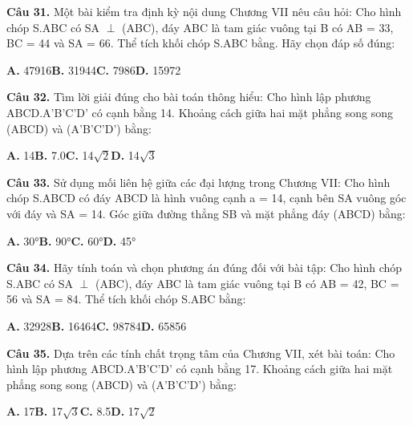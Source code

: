 \documentclass[11pt,a4paper]{article}
\begin{document}
\textbf{\color{primary} Câu 31.} Một bài kiểm tra định kỳ nội dung Chương VII nêu câu hỏi: Cho hình chóp S.ABC có SA $\perp$ (ABC), đáy ABC là tam giác vuông tại B có AB = 33, BC = 44 và SA = 66. Thể tích khối chóp S.ABC bằng. Hãy chọn đáp số đúng:\par
\hspace*{1.5em}\textbf{A.} 47916\quad\quad \textbf{B.} 31944\quad\quad \textbf{C.} 7986\quad\quad \textbf{D.} 15972\par\vspace{2pt}
\textbf{\color{primary} Câu 32.} Tìm lời giải đúng cho bài toán thông hiểu: Cho hình lập phương ABCD.A'B'C'D' có cạnh bằng 14. Khoảng cách giữa hai mặt phẳng song song (ABCD) và (A'B'C'D') bằng:\par
\hspace*{1.5em}\textbf{A.} 14\quad\quad \textbf{B.} 7.0\quad\quad \textbf{C.} 14$\sqrt{2}$\quad\quad \textbf{D.} 14$\sqrt{3}$\par\vspace{2pt}
\textbf{\color{primary} Câu 33.} Sử dụng mối liên hệ giữa các đại lượng trong Chương VII: Cho hình chóp S.ABCD có đáy ABCD là hình vuông cạnh a = 14, cạnh bên SA vuông góc với đáy và SA = 14. Góc giữa đường thẳng SB và mặt phẳng đáy (ABCD) bằng:\par
\hspace*{1.5em}\textbf{A.} 30°\quad\quad \textbf{B.} 90°\quad\quad \textbf{C.} 60°\quad\quad \textbf{D.} 45°\par\vspace{2pt}
\textbf{\color{primary} Câu 34.} Hãy tính toán và chọn phương án đúng đối với bài tập: Cho hình chóp S.ABC có SA $\perp$ (ABC), đáy ABC là tam giác vuông tại B có AB = 42, BC = 56 và SA = 84. Thể tích khối chóp S.ABC bằng:\par
\hspace*{1.5em}\textbf{A.} 32928\quad\quad \textbf{B.} 16464\quad\quad \textbf{C.} 98784\quad\quad \textbf{D.} 65856\par\vspace{2pt}
\textbf{\color{primary} Câu 35.} Dựa trên các tính chất trọng tâm của Chương VII, xét bài toán: Cho hình lập phương ABCD.A'B'C'D' có cạnh bằng 17. Khoảng cách giữa hai mặt phẳng song song (ABCD) và (A'B'C'D') bằng:\par
\hspace*{1.5em}\textbf{A.} 17\quad\quad \textbf{B.} 17$\sqrt{3}$\quad\quad \textbf{C.} 8.5\quad\quad \textbf{D.} 17$\sqrt{2}$\par\vspace{2pt}
\end{document}
